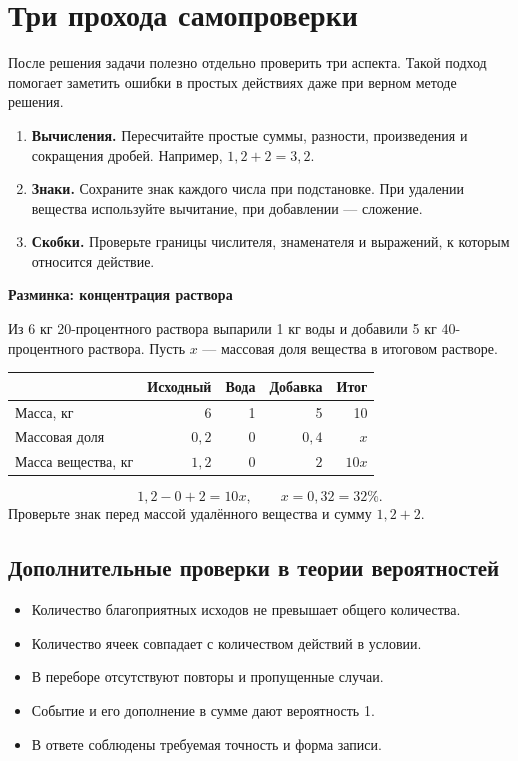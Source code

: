 \documentclass[a4paper,12pt]{article}
\newcommand{\example}[1]{\par\medskip\textcolor{darkaccent}{\textbf{#1}}\par}
\begin{document}
\clearpage
\section{Три прохода самопроверки}
После решения задачи полезно отдельно проверить три аспекта. Такой подход помогает заметить ошибки в простых действиях даже при верном методе решения.
\begin{enumerate}
\item \textbf{Вычисления.} Пересчитайте простые суммы, разности, произведения и сокращения дробей. Например, $1,2+2=3,2$.
\item \textbf{Знаки.} Сохраните знак каждого числа при подстановке. При удалении вещества используйте вычитание, при добавлении --- сложение.
\item \textbf{Скобки.} Проверьте границы числителя, знаменателя и выражений, к которым относится действие.
\end{enumerate}
\example{Разминка: концентрация раствора}
Из 6 кг 20-процентного раствора выпарили 1 кг воды и добавили 5 кг 40-процентного раствора. Пусть $x$ --- массовая доля вещества в итоговом растворе.
\begin{center}
\small
\begin{tabularx}{\linewidth}{@{}Xrrrr@{}}
\toprule
 & Исходный & Вода & Добавка & Итог\\
\midrule
Масса, кг & 6 & 1 & 5 & 10\\
Массовая доля & $0,2$ & $0$ & $0,4$ & $x$\\
Масса вещества, кг & $1,2$ & $0$ & $2$ & $10x$\\
\bottomrule
\end{tabularx}
\end{center}
\[ 1,2-0+2=10x,\qquad x=0,32=32\%. \]
Проверьте знак перед массой удалённого вещества и сумму $1,2+2$.
\subsection*{Дополнительные проверки в теории вероятностей}
\begin{itemize}
\item Количество благоприятных исходов не превышает общего количества.
\item Количество ячеек совпадает с количеством действий в условии.
\item В переборе отсутствуют повторы и пропущенные случаи.
\item Событие и его дополнение в сумме дают вероятность 1.
\item В ответе соблюдены требуемая точность и форма записи.
\end{itemize}
\end{document}
